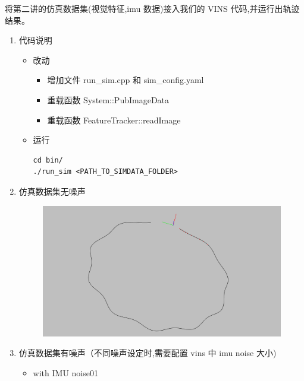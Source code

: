 \documentclass[12pt,a4paper]{article}
\begin{document}
\maketitle

\noindent
\setlength{\parindent}{2em}
\setlength{\parskip}{0.3em}


将第二讲的仿真数据集(视觉特征,imu 数据)接入我们的 VINS 代码,并运行出轨迹结果。

\begin{enumerate}

\item 代码说明

\begin{itemize}
\item 改动
\begin{itemize}
\item 增加文件 run\_sim.cpp 和 sim\_config.yaml
\item 重载函数 System::PubImageData
\item 重载函数 FeatureTracker::readImage
\end{itemize}
\item 运行
\begin{lstlisting}
cd bin/
./run_sim <PATH_TO_SIMDATA_FOLDER>
\end{lstlisting}
\end{itemize}

\item 仿真数据集无噪声

\begin{figure}[htbp] 
	\centering
	\includegraphics[width=15cm]{images/trajectory.png}
\end{figure} 

\newpage
\item 仿真数据集有噪声（不同噪声设定时,需要配置 vins 中 imu noise 大小)

\begin{itemize}
  \item with IMU noise01
  

\end{itemize}
\end{enumerate}
\end{document}
